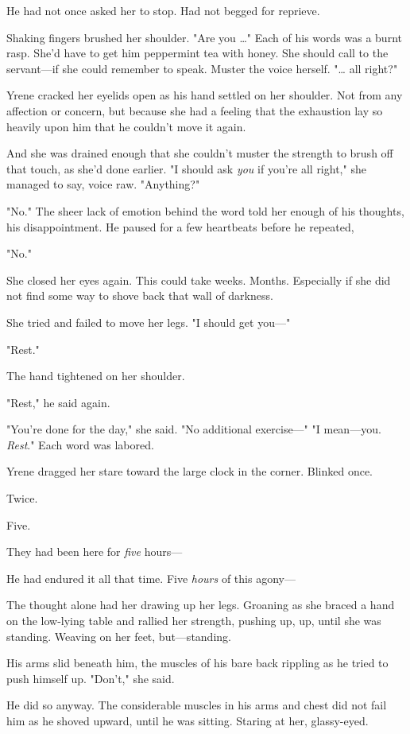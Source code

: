 He had not once asked her to stop. Had not begged for reprieve.

Shaking fingers brushed her shoulder. "Are  you \ldots" Each of his words was a burnt rasp. She'd have to get him peppermint tea with honey. She should call to the servant---if she could remember to speak. Muster the voice herself. "\ldots{} all right?"

Yrene cracked her eyelids open as his hand settled on her shoulder. Not from any affection or concern, but because she had a feeling that the exhaustion lay so heavily upon him that he couldn't move it again.

And she was drained enough that she couldn't muster the strength to brush off that touch, as she'd done earlier. "I should ask \emph{you}
if you're all right," she managed to say, voice raw. "Anything?"

"No." The sheer lack of emotion behind the word told her enough of his thoughts, his disappointment. He paused for a few heartbeats before he repeated,

"No."

She closed her eyes again. This could take weeks. Months. Especially if she did not find some way to shove back that wall of darkness.

She tried and failed to move her legs. "I should get you---"

"Rest."

The hand tightened on her shoulder.

"Rest," he said again.

"You're done for the day," she said. "No additional exercise---" "I mean---you. \emph{Rest}." Each word was labored.

Yrene dragged her stare toward the large clock in the corner. Blinked once.

Twice.

Five.

They had been here for \emph{five} hours---

He had endured it all that time. Five \emph{hours} of this agony---

The thought alone had her drawing up her legs. Groaning as she braced a hand on the low-lying table and rallied her strength, pushing up, up, until she was standing. Weaving on her feet, but---standing.

His arms slid beneath him, the muscles of his bare back rippling as he tried to push himself up. "Don't," she said.

He did so anyway. The considerable muscles in his arms and chest did not fail him as he shoved upward, until he was sitting. Staring at her, glassy-eyed.

